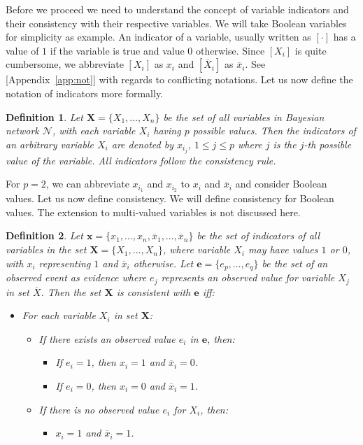 \documentclass[a4paper,10pt]{article}
\theoremstyle{plain}
\newtheorem*{spn-def}{Definition}
\begin{document}
Before we proceed we need to understand the concept of variable indicators and their consistency
with their respective variables. We will take Boolean variables for simplicity as example. An
indicator of a variable, usually written as $[\cdot]$ has a value of $1$ if the variable is true
and value $0$ otherwise. Since $[X_i]$ is quite cumbersome, we abbreviate $[X_i]$ as $x_i$
and $[\overline{X}_i]$ as $\overline{x}_i$. See [Appendix~\ref{app:not}] with regards to
conflicting notations. Let us now define the notation of indicators more formally.

\begin{spn-def}
  Let $\mathbf{X}=\{X_1,\ldots,X_n\}$ be the set of all variables in Bayesian network
  $\mathcal{N}$, with each variable $X_i$ having $p$ possible values. Then the indicators of
  an arbitrary variable $X_i$ are denoted by $x_{i_j}$, $1\leq j \leq p$ where $j$ is the $j$-th
  possible value of the variable. All indicators follow the consistency rule.
\end{spn-def}

For $p=2$, we can abbreviate $x_{i_1}$ and $x_{i_2}$ to $x_i$ and $\overline{x}_i$ and consider
Boolean values. Let us now define consistency. We will define consistency for Boolean values. The
extension to multi-valued variables is not discussed here.

\begin{spn-def}
  Let $\mathbf{x}=\{x_1,\ldots,x_n,\overline{x}_1,\ldots,\overline{x}_n\}$ be the set of indicators
  of all variables in the set $\mathbf{X}=\{X_1,\ldots,X_n\}$, where variable $X_i$ may have values
  $1$ or $0$, with $x_i$ representing $1$ and $\overline{x}_i$ otherwise. Let $\mathbf{e}=\{e_p,
  \ldots,e_q\}$ be the set of an observed event as evidence where $e_j$ represents an observed
  value for variable $X_j$ in set $\overline{X}$. Then the set $\mathbf{X}$ is consistent with
  $\mathbf{e}$ iff:

  \begin{itemize}
    \item For each variable $X_i$ in set $\mathbf{X}$:
      \begin{itemize}
        \item If there exists an observed value $e_i$ in $\mathbf{e}$, then:
        \begin{itemize}
          \item If $e_i=1$, then $x_i=1$ and $\overline{x}_i=0$.
          \item If $e_i=0$, then $x_i=0$ and $\overline{x}_i=1$.
        \end{itemize}
        \item If there is no observed value $e_i$ for $X_i$, then:
        \begin{itemize}
          \item $x_i=1$ and $\overline{x}_i=1$.
        \end{itemize}
      \end{itemize}
  \end{itemize}
\end{spn-def}
\end{document}
